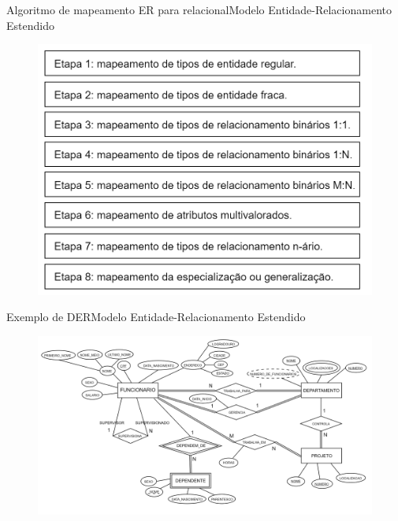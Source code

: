 \documentclass[t]{beamer}
\begin{document}

\begin{ftst}{Algoritmo de mapeamento ER para relacional}{Modelo Entidade-Relacionamento Estendido}
\begin{figure}
    \centering
    \includegraphics[scale=0.28]{Figuras/03_01.png}
\end{figure}
\end{ftst}


\begin{ftst}{Exemplo de DER}{Modelo Entidade-Relacionamento Estendido}
\begin{figure}
    \centering
    \includegraphics[scale=0.11]{Figuras/03_02.png}
\end{figure}
\end{ftst}

\end{document}
